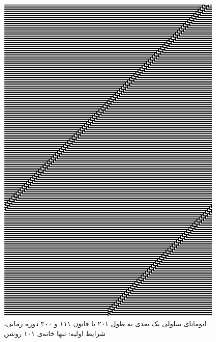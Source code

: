 \documentclass[11pt, a4paper]{article}
\begin{document}
\begin{figure}[!tbp]
\begin{minipage}[b]{0.3\textwidth}
	\includegraphics[width=\textwidth]{q3-111}
    \caption{اتوماتای سلولی یک بعدی به طول ۲۰۱ با قانون ۱۱۱ و ۳۰۰ دوره زمانی، شرایط اولیه: تنها خانه‌ی ۱۰۱ روشن}
	\label{fig:q3-111}
  \end{minipage}
  \hfill
\end{figure}
\end{document}
